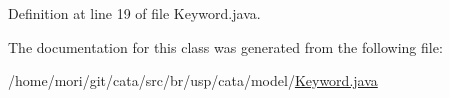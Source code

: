 Definition at line 19 of file Keyword.\+java.



The documentation for this class was generated from the following file\+:\begin{DoxyCompactItemize}
\item 
/home/mori/git/cata/src/br/usp/cata/model/\hyperlink{_keyword_8java}{Keyword.\+java}\end{DoxyCompactItemize}
